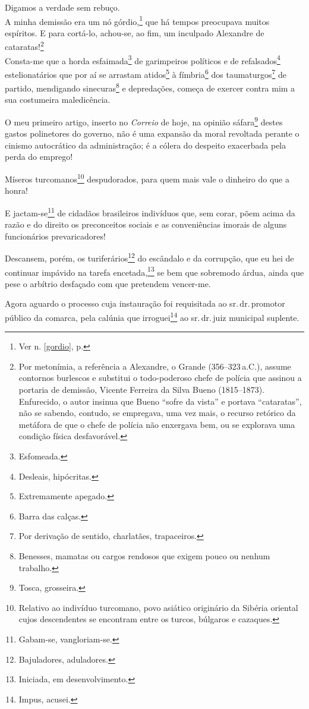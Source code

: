 Digamos a verdade sem rebuço.\\
A minha demissão era um nó górdio,\footnote{Ver n. \ref{gordio}, p. \pageref{gordio}} 
que há tempos preocupava muitos espíritos. E para cortá-lo, achou-se, ao fim, 
um inculpado Alexandre de cataratas!\footnote{Por metonímia, a referência 
a Alexandre, o Grande (356--323\,a.C.), assume contornos burlescos e substitui 
o todo-poderoso chefe de polícia que assinou a portaria de demissão, Vicente 
Ferreira da Silva Bueno (1815--1873). Enfurecido, o autor insinua que Bueno
  ``sofre da vista'' e portava ``cataratas'', não se sabendo, contudo, se
  empregava, uma vez mais, o recurso retórico da metáfora de que o chefe
  de polícia não enxergava bem, ou se explorava uma condição física
  desfavorável.}\\
Consta-me que a horda esfaimada\footnote{Esfomeada.} de garimpeiros
políticos e de refalsados\footnote{Desleais, hipócritas.}
estelionatários que por aí se arrastam atidos\footnote{Extremamente
  apegado.} à fímbria\footnote{Barra das calças.} dos
taumaturgos\footnote{Por derivação de sentido, charlatães,
  trapaceiros.} de partido, mendigando sinecuras\footnote{Benesses,
  mamatas ou cargos rendosos que exigem pouco ou nenhum trabalho.} e
depredações, começa de exercer contra mim a sua costumeira maledicência.

O meu primeiro artigo, inserto no \emph{Correio} de hoje, na opinião
sáfara\footnote{Tosca, grosseira.} destes gastos polinetores do
governo, não é uma expansão da moral revoltada perante o cinismo
autocrático da administração; é a cólera do despeito exacerbada pela
perda do emprego!

Míseros turcomanos\footnote{Relativo ao indivíduo turcomano, povo
  asiático originário da Sibéria oriental cujos descendentes se
  encontram entre os turcos, búlgaros e cazaques.} despudorados, para
quem mais vale o dinheiro do que a honra!

E jactam-se\footnote{Gabam-se, vangloriam-se.} de cidadãos brasileiros
indivíduos que, sem corar, põem acima da razão e do direito os
preconceitos sociais e as conveniências imorais de alguns funcionários
prevaricadores!

Descansem, porém, os turiferários\footnote{Bajuladores, aduladores.}
do escândalo e da corrupção, que eu hei de continuar impávido na tarefa
encetada,\footnote{Iniciada, em desenvolvimento.} se bem que sobremodo
árdua, ainda que pese o arbítrio desfaçado com que pretendem vencer-me.

Agora aguardo o processo cuja instauração foi requisitada ao sr.\,dr.\,promotor público da comarca, pela calúnia que irroguei\footnote{Impus,
  acusei.} ao sr.\,dr.\,juiz municipal suplente.

